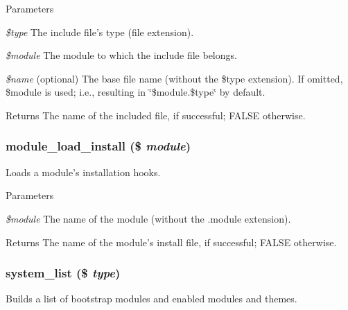 \begin{DoxyParams}{Parameters}
\item[{\em \$type}]The include file's type (file extension). \item[{\em \$module}]The module to which the include file belongs. \item[{\em \$name}](optional) The base file name (without the \$type extension). If omitted, \$module is used; i.e., resulting in \char`\"{}\$module.\$type\char`\"{} by default.\end{DoxyParams}
\begin{DoxyReturn}{Returns}
The name of the included file, if successful; FALSE otherwise. 
\end{DoxyReturn}
\hypertarget{module_8inc_a77a6101f363c066eafbe29b26af5bfd3}{
\subsubsection[{module\_\-load\_\-install}]{\setlength{\rightskip}{0pt plus 5cm}module\_\-load\_\-install (\$ {\em module})}}
\label{module_8inc_a77a6101f363c066eafbe29b26af5bfd3}
Loads a module's installation hooks.


\begin{DoxyParams}{Parameters}
\item[{\em \$module}]The name of the module (without the .module extension).\end{DoxyParams}
\begin{DoxyReturn}{Returns}
The name of the module's install file, if successful; FALSE otherwise. 
\end{DoxyReturn}
\hypertarget{module_8inc_a807821e98f8d626a7043923080ba6438}{
\subsubsection[{system\_\-list}]{\setlength{\rightskip}{0pt plus 5cm}system\_\-list (\$ {\em type})}}
\label{module_8inc_a807821e98f8d626a7043923080ba6438}
Builds a list of bootstrap modules and enabled modules and themes.


